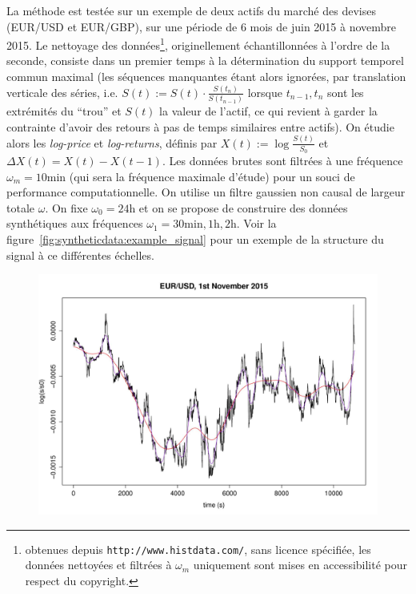 {La méthode est testée sur un exemple de deux actifs du marché des devises (EUR/USD et EUR/GBP), sur une période de 6 mois de juin 2015 à novembre 2015. Le nettoyage des données\footnote{obtenues depuis \texttt{http://www.histdata.com/}, sans licence spécifiée, les données nettoyées et filtrées à $\omega_m$ uniquement sont mises en accessibilité pour respect du copyright.}, originellement échantillonnées à l'ordre de la seconde, consiste dans un premier temps à la détermination du support temporel commun maximal (les séquences manquantes étant alors ignorées, par translation verticale des séries, i.e. $S(t):=S(t)\cdot \frac{S(t_{n})}{S(t_{n-1})}$ lorsque $t_{n-1},t_n$ sont les extrémités du ``trou'' et $S(t)$ la valeur de l'actif, ce qui revient à garder la contrainte d'avoir des retours à pas de temps similaires entre actifs). On étudie alors les \emph{log-price} et \emph{log-returns}, définis par $X(t):=\log{\frac{S(t)}{S_0}}$ et $\Delta X (t) = X(t) - X(t-1)$. Les données brutes sont filtrées à une fréquence $\omega_m = 10\textrm{min}$ (qui sera la fréquence maximale d'étude) pour un souci de performance computationnelle. On utilise un filtre gaussien non causal de largeur totale $\omega$. On fixe $\omega_0=24\textrm{h}$ et on se propose de construire des données synthétiques aux fréquences $\omega_1 = 30\textrm{min},1\textrm{h},2\textrm{h}$. Voir la figure~\ref{fig:syntheticdata:example_signal} pour un exemple de la structure du signal à ce différentes échelles.
}


\begin{figure}%
\includegraphics[width=\linewidth]{Figures/Final/C-syntheticdata-example_signal.jpg}
\end{figure}



